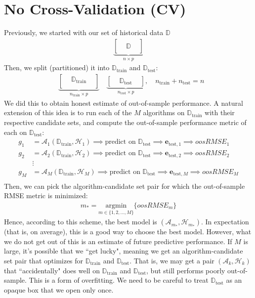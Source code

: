 \documentclass[12pt, a4paper]{article}
\theoremstyle{definition}
\newcommand{\test}{\text{test}}
\newcommand{\train}{\text{train}}
\newcommand{\Dtest}{\mathbb{D}_{\test}}
\newcommand{\Dtrain}{\mathbb{D}_{\train}}
\begin{document}
	\section*{No Cross-Validation (CV)}
	Previously, we started with our set of historical data $\mathbb{D}$
	\begin{align*}
		\underbrace{
		\begin{bmatrix}
			{} & {} & {}\\
			{} & \mathbb{D} & {}\\
			{} & {} & {}
		\end{bmatrix}
		}_{n\times p}
	\end{align*}
	Then, we split (partitioned) it into $\mathbb{D}_{\text{train}}$ and $\mathbb{D}_{\text{test}}$:
	\begin{align*}
		&\underbrace{
		\begin{bmatrix}
			{} & \mathbb{D}_{\text{train}} & {}\\
			{} & {} & {}
		\end{bmatrix}
		}_{n_{\text{train}}\times p}\quad
		\underbrace{
		\begin{bmatrix}
			{} & \mathbb{D}_{\text{test}} & {}
		\end{bmatrix}
		}_{n_{\text{test}}\times p},\quad n_{\train} + n_{\test} = n
	\end{align*}
	We did this to obtain honest estimate of out-of-sample performance.
	A natural extension of this idea is to run each of the $M$ algorithms on $\Dtrain$
	with their respective candidate sets, and compute the out-of-sample performance metric of
	each on $\Dtest$:
	\begin{align*}
		g_1&=\mathcal{A}_1(\mathbb{D}_{\text{train}}, \mathcal{H}_{1})\implies
		\text{predict on }\Dtest\implies
		\bm{e}_{\test,1}\implies oosRMSE_1\\
		g_2&=\mathcal{A}_2(\mathbb{D}_{\text{train}}, \mathcal{H}_{2})\implies
		\text{predict on }\Dtest\implies
		\bm{e}_{\test,2}\implies oosRMSE_2\\
		&\vdots\\
		g_M&=\mathcal{A}_M(\mathbb{D}_{\text{train}}, \mathcal{H}_{M})\implies
		\text{predict on }\Dtest\implies
		\bm{e}_{\test,M}\implies oosRMSE_M\\
	\end{align*}
	Then, we can pick the algorithm-candidate set pair for which the out-of-sample
	RMSE metric is minimized:
	\begin{align*}
		m_* = \underset{m\in \{1,2,\ldots,M\}}{\text{argmin}}\{oosRMSE_m\}
	\end{align*}
	Hence, according to this scheme, the best model is $(\mathcal{A}_{m_*}, \mathcal{H}_{m_*})$.
	In expectation (that is, on average), this is a good way to choose the best
	model. However, what we do not get out of this is an estimate of future
	predictive performance. If $M$ is large, it's possible that we ``get lucky",
	meaning we get an algorithm-candidate set pair that optimizes for $\Dtrain$ and $\Dtest$.
	That is, we may get a pair $(\mathcal{A}_k, \mathcal{H}_k)$ that ``accidentally"
	does well on $\Dtrain$ and $\Dtest$, but still performs poorly out-of-sample.
	This is a form of overfitting. We need to be careful to treat $\Dtest$ as an
	opaque box that we open only once.
	
\end{document}
